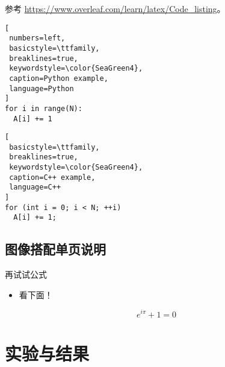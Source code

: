 \documentclass[
    fontset=fandol,
    xcolor=x11names %
]{ctexbeamer}
\begin{document}
\begin{frame}[fragile] %

参考 \url{https://www.overleaf.com/learn/latex/Code_listing}。

\begin{minipage}{.49\linewidth}

\begin{lstlisting}[
 numbers=left,
 basicstyle=\ttfamily,
 breaklines=true,
 keywordstyle=\color{SeaGreen4},
 caption=Python example,
 language=Python
]
for i in range(N):
  A[i] += 1
\end{lstlisting}

\end{minipage}\begin{minipage}{.49\linewidth}

\begin{lstlisting}[
 basicstyle=\ttfamily,
 breaklines=true,
 keywordstyle=\color{SeaGreen4},
 caption=C++ example,
 language=C++
]
for (int i = 0; i < N; ++i)
  A[i] += 1;
\end{lstlisting}

\end{minipage}
    
\end{frame}

\subsection{图像搭配单页说明}

\begin{frame}

    \begin{block}{再试试公式}
        \begin{itemize}
            \item 看下面！
        \end{itemize}
    \end{block}

    \begin{equation}
        e^{i\pi}+1=0
    \end{equation}

\end{frame}

\section{实验与结果}
\end{document}
